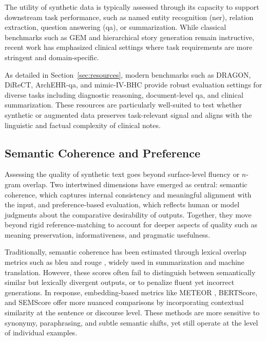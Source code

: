 The utility of synthetic data is typically assessed through its capacity to support downstream task performance, such as named entity recognition (\gls{ner}), relation extraction, question answering (\gls{qa}), or summarization. While classical benchmarks such as GEM \citep{gehrmann2021gem} and hierarchical story generation \citep{fan2018hierarchical} remain instructive, recent work has emphasized clinical settings where task requirements are more stringent and domain-specific.

As detailed in Section~\ref{sec:resources}, modern benchmarks such as DRAGON, DiReCT, ArchEHR-\gls{qa}, and \gls{mimic}-IV-BHC provide robust evaluation settings for diverse tasks including diagnostic reasoning, document-level \gls{qa}, and clinical summarization. These resources are particularly well-suited to test whether synthetic or augmented data preserves task-relevant signal and aligns with the linguistic and factual complexity of clinical notes.

\subsection{Semantic Coherence and Preference}
Assessing the quality of synthetic text goes beyond surface-level fluency or $n$-gram overlap. Two intertwined dimensions have emerged as central: semantic coherence, which captures internal consistency and meaningful alignment with the input, and preference-based evaluation, which reflects human or model judgments about the comparative desirability of outputs. Together, they move beyond rigid reference-matching to account for deeper aspects of quality such as meaning preservation, informativeness, and pragmatic usefulness.

Traditionally, semantic coherence has been estimated through lexical overlap metrics such as \gls{bleu} \citep{papineni2002bleu} and \gls{rouge} \citep{lin2004rouge}, widely used in summarization and machine translation. However, these scores often fail to distinguish between semantically similar but lexically divergent outputs, or to penalize fluent yet incorrect generations. In response, embedding-based metrics like METEOR \citep{banerjee2005meteor}, BERTScore, and SEMScore \citep{aynetdinov2024semscore} offer more nuanced comparisons by incorporating contextual similarity at the sentence or discourse level. These methods are more sensitive to synonymy, paraphrasing, and subtle semantic shifts, yet still operate at the level of individual examples.

